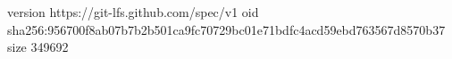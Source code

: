 version https://git-lfs.github.com/spec/v1
oid sha256:956700f8ab07b7b2b501ca9fc70729bc01e71bdfc4acd59ebd763567d8570b37
size 349692
